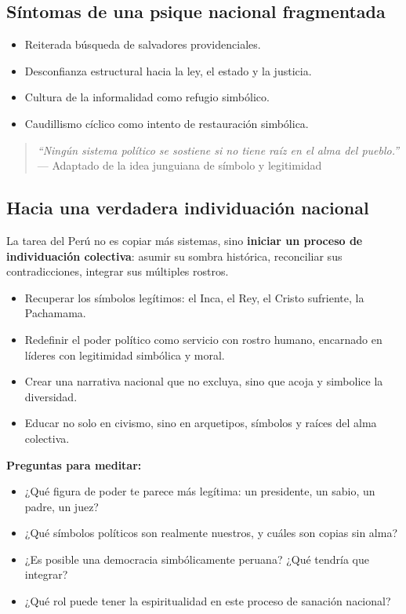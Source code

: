 \subsection*{Síntomas de una psique nacional fragmentada}

\begin{itemize}
	\item Reiterada búsqueda de salvadores providenciales.
	\item Desconfianza estructural hacia la ley, el estado y la justicia.
	\item Cultura de la informalidad como refugio simbólico.
	\item Caudillismo cíclico como intento de restauración simbólica.
\end{itemize}

\begin{quote}
	\emph{“Ningún sistema político se sostiene si no tiene raíz en el alma del pueblo.”} \\ — Adaptado de la idea junguiana de símbolo y legitimidad
\end{quote}

\subsection*{Hacia una verdadera individuación nacional}

La tarea del Perú no es copiar más sistemas, sino \textbf{iniciar un proceso de individuación colectiva}: asumir su sombra histórica, reconciliar sus contradicciones, integrar sus múltiples rostros.

\begin{itemize}
	\item Recuperar los símbolos legítimos: el Inca, el Rey, el Cristo sufriente, la Pachamama.
	\item Redefinir el poder político como servicio con rostro humano, encarnado en líderes con legitimidad simbólica y moral.
	\item Crear una narrativa nacional que no excluya, sino que acoja y simbolice la diversidad.
	\item Educar no solo en civismo, sino en arquetipos, símbolos y raíces del alma colectiva.
\end{itemize}

\textbf{Preguntas para meditar:}
\begin{itemize}
	\item ¿Qué figura de poder te parece más legítima: un presidente, un sabio, un padre, un juez?
	\item ¿Qué símbolos políticos son realmente nuestros, y cuáles son copias sin alma?
	\item ¿Es posible una democracia simbólicamente peruana? ¿Qué tendría que integrar?
	\item ¿Qué rol puede tener la espiritualidad en este proceso de sanación nacional?
\end{itemize}


